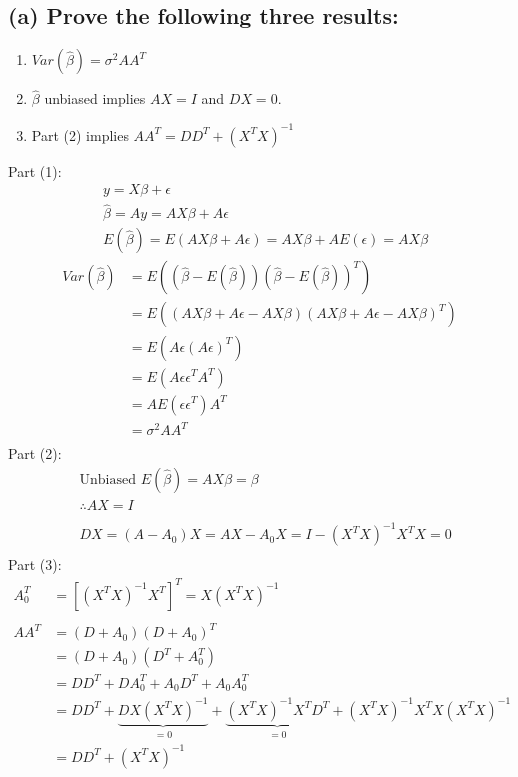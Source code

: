 \documentclass[12pt, a4paper]{article}
\begin{document}
\subsection*{(a) Prove the following three results:}
\begin{enumerate}
    \item $Var(\hat{\beta}) = \sigma^2AA^T$
    \item $\hat{\beta}$ unbiased implies $AX = I$ and $DX = 0$.
    \item Part (2) implies $AA^T = DD^T + (X^TX)^{-1}$
\end{enumerate}
Part (1):
\begin{align*}
    &y = X\beta + \epsilon\\
    &\hat{\beta} = Ay = AX\beta + A\epsilon\\
    &E(\hat{\beta}) = E(AX\beta + A\epsilon) = AX\beta + AE(\epsilon) = AX\beta
\end{align*}
\begin{align*}
    Var(\hat{\beta}) &= E((\hat{\beta} - E(\hat{\beta}))(\hat{\beta} - E(\hat{\beta}))^T)\\
    &= E((AX\beta + A\epsilon - AX\beta)(AX\beta + A\epsilon - AX\beta)^T)\\
    & = E(A\epsilon(A\epsilon)^T)\\
    &= E(A\epsilon\epsilon^TA^T)\\
    &= AE(\epsilon\epsilon^T)A^T\\
    & = \sigma^2AA^T\\
\end{align*}
Part (2):
\begin{align*}
    &\text{Unbiased }E(\hat{\beta}) = AX\beta = \beta\\
    &\therefore AX = I\\\\
    &DX = (A-A_0)X = AX - A_0X = I - (X^TX)^{-1}X^TX = 0\\
\end{align*}
Part (3):
\begin{align*}
    A_0^T&=[(X^TX)^{-1}X^T]^T = X(X^TX)^{-1}\\\\
    AA^T&=(D+A_0)(D+A_0)^T\\
    &=(D+A_0)(D^T+A_0^T)\\
    &=DD^T + DA_0^T + A_0D^T + A_0A_0^T\\
    &=DD^T + \underbrace{DX(X^TX)^{-1}}_{=0} + \underbrace{(X^TX)^{-1}X^TD^T}_{=0} + (X^TX)^{-1}X^TX(X^TX)^{-1}\\
    &=DD^T + (X^TX)^{-1}
\end{align*}
\vspace{1em}
\end{document}
